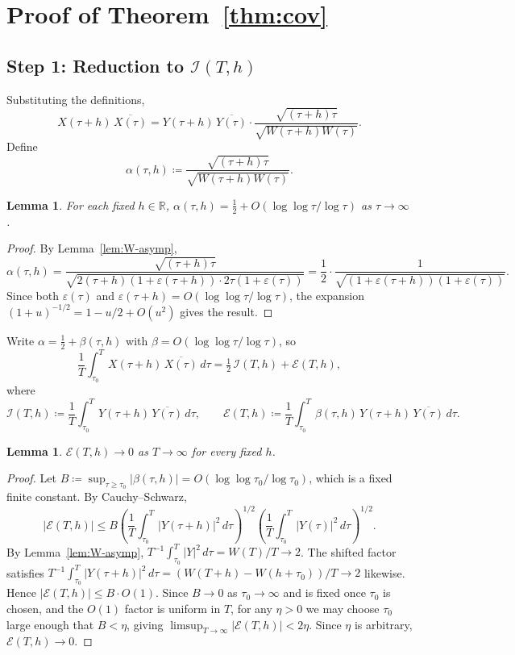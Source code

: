 \documentclass{amsart}
\newtheorem{lemma}[theorem]{Lemma}
\newcommand{\assign}{\coloneqq}
\begin{document}
\section{Proof of Theorem~\ref{thm:cov}}

\subsection*{Step 1: Reduction to $\mathcal{I}(T,h)$}

Substituting the definitions,
\[
  X(\tau+h)\,\overline{X(\tau)}
  = Y(\tau+h)\,\overline{Y(\tau)}\cdot
    \frac{\sqrt{(\tau+h)\tau}}{\sqrt{W(\tau+h)W(\tau)}}.
\]
Define
\[
  \alpha(\tau,h) \assign \frac{\sqrt{(\tau+h)\tau}}{\sqrt{W(\tau+h)W(\tau)}}.
\]

\begin{lemma}\label{lem:alpha}
For each fixed $h \in \mathbb{R}$, $\alpha(\tau,h) = \tfrac{1}{2} + O(\log\log\tau/\log\tau)$ as $\tau\to\infty$.
\end{lemma}
\begin{proof}
By Lemma~\ref{lem:W-asymp},
\[
  \alpha(\tau,h)
  = \frac{\sqrt{(\tau+h)\tau}}{\sqrt{2(\tau+h)(1+\varepsilon(\tau+h))\cdot 2\tau(1+\varepsilon(\tau))}}
  = \frac{1}{2}\cdot\frac{1}{\sqrt{(1+\varepsilon(\tau+h))(1+\varepsilon(\tau))}}.
\]
Since both $\varepsilon(\tau)$ and $\varepsilon(\tau+h) = O(\log\log\tau/\log\tau)$, the
expansion $(1+u)^{-1/2} = 1 - u/2 + O(u^2)$ gives the result.
\end{proof}

Write $\alpha = \tfrac{1}{2} + \beta(\tau,h)$ with $\beta = O(\log\log\tau/\log\tau)$, so
\begin{equation}\label{eq:split}
  \frac{1}{T}\int_{\tau_0}^T X(\tau+h)\,\overline{X(\tau)}\,d\tau
  = \tfrac{1}{2}\,\mathcal{I}(T,h) + \mathcal{E}(T,h),
\end{equation}
where
\[
  \mathcal{I}(T,h) \assign \frac{1}{T}\int_{\tau_0}^T Y(\tau+h)\,\overline{Y(\tau)}\,d\tau,
  \qquad
  \mathcal{E}(T,h) \assign \frac{1}{T}\int_{\tau_0}^T \beta(\tau,h)\,Y(\tau+h)\,\overline{Y(\tau)}\,d\tau.
\]

\begin{lemma}\label{lem:E-vanishes}
$\mathcal{E}(T,h) \to 0$ as $T\to\infty$ for every fixed $h$.
\end{lemma}
\begin{proof}
Let $B \assign \sup_{\tau \ge \tau_0}|\beta(\tau,h)| = O(\log\log\tau_0/\log\tau_0)$,
which is a fixed finite constant. By Cauchy--Schwarz,
\[
  |\mathcal{E}(T,h)|
  \le B \left(\frac{1}{T}\int_{\tau_0}^T |Y(\tau+h)|^2\,d\tau\right)^{1/2}
       \left(\frac{1}{T}\int_{\tau_0}^T |Y(\tau)|^2\,d\tau\right)^{1/2}.
\]
By Lemma~\ref{lem:W-asymp}, $T^{-1}\int_{\tau_0}^T |Y|^2\,d\tau = W(T)/T \to 2$.
The shifted factor satisfies $T^{-1}\int_{\tau_0}^T |Y(\tau+h)|^2\,d\tau
= (W(T+h)-W(h+\tau_0))/T \to 2$ likewise. Hence $|\mathcal{E}(T,h)| \le B \cdot O(1)$.
Since $B \to 0$ as $\tau_0\to\infty$ and is fixed once $\tau_0$ is chosen,
and the $O(1)$ factor is uniform in $T$, for any $\eta > 0$ we may choose
$\tau_0$ large enough that $B < \eta$, giving $\limsup_{T\to\infty}|\mathcal{E}(T,h)| < 2\eta$.
Since $\eta$ is arbitrary, $\mathcal{E}(T,h)\to 0$.
\end{proof}
\end{document}
